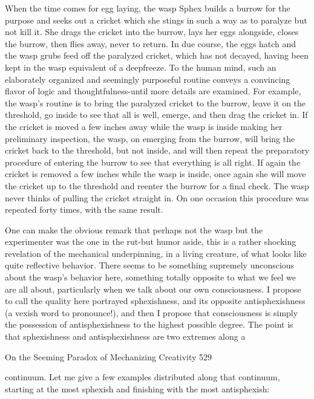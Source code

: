   When the time comes for egg laying, the wasp Sphex builds a burrow for the
  purpose and seeks out a cricket which she stings in such a way as to paralyze
  but not kill it. She drags the cricket into the burrow, lays her eggs alongside,
  closes the burrow, then flies away, never to return. In due course, the eggs hatch
  and the wasp grubs feed off the paralyzed cricket, which has not decayed,
  having been kept in the wasp equivalent of a deepfreeze. To the human mind,
  such an elaborately organized and seemingly purposeful routine conveys a
  convincing flavor of logic and thoughtfulness-until more details are examined.
  For example, the wasp's routine is to bring the paralyzed cricket to the burrow,
  leave it on the threshold, go inside to see that all is well, emerge, and then drag
  the cricket in. If the cricket is moved a few inches away while the wasp is inside
  making her preliminary inspection, the wasp, on emerging from the burrow, will
  bring the cricket back to the threshold, but not inside, and will then repeat the
  preparatory procedure of entering the burrow to see that everything is all right.
  If again the cricket is removed a few inches while the wasp is inside, once again
  she will move the cricket up to the threshold and reenter the burrow for a final
  check. The wasp never thinks of pulling the cricket straight in. On one occasion
  this procedure was repeated forty times, with the same result.

        One can make the obvious remark that perhaps not the wasp but the
experimenter was the one in the rut-but humor aside, this is a rather shocking
revelation of the mechanical underpinning, in a living creature, of what looks like
quite reflective behavior. There seems to be something supremely unconscious about
the wasp's behavior here, something totally opposite to what we feel we are all about,
particularly when we talk about our own consciousness. I propose to call the quality
here portrayed sphexishness, and its opposite antisphexishness (a vexish word to
pronounce!), and then I propose that consciousness is simply the possession of
antisphexishness to the highest possible degree. The point is that sphexishness and
antisphexishness are two extremes along a




On the Seeming Paradox of Mechanizing Creativity                                    529

continuum. Let me give a few examples distributed along that continuum, starting at
the most sphexish and finishing with the most antisphexish:

